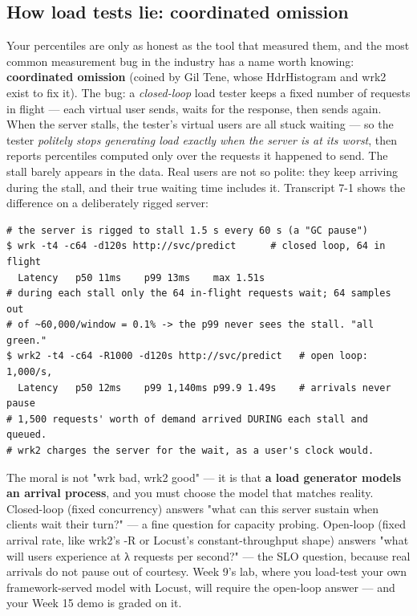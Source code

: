 \subsection*{How load tests lie: coordinated omission}

Your percentiles are only as honest as the tool that measured them, and the most common measurement bug in the industry has a name worth knowing: \textbf{coordinated omission} (coined by Gil Tene, whose HdrHistogram and wrk2 exist to fix it). The bug: a \textit{closed-loop} load tester keeps a fixed number of requests in flight — each virtual user sends, waits for the response, then sends again. When the server stalls, the tester's virtual users are all stuck waiting — so the tester \textit{politely stops generating load exactly when the server is at its worst}, then reports percentiles computed only over the requests it happened to send. The stall barely appears in the data. Real users are not so polite: they keep arriving during the stall, and their true waiting time includes it. Transcript 7-1 shows the difference on a deliberately rigged server:

\begin{terminalbox}
\begin{Verbatim}[breaklines=true,breakanywhere=true,fontsize=\small,formatcom=\color{tbbtermfg},codes=\tbbcodeactive]
# the server is rigged to stall 1.5 s every 60 s (a "GC pause")
$ wrk -t4 -c64 -d120s http://svc/predict      # closed loop, 64 in flight
  Latency   p50 11ms    p99 13ms    max 1.51s
# during each stall only the 64 in-flight requests wait; 64 samples out
# of ~60,000/window = 0.1% -> the p99 never sees the stall. "all green."
$ wrk2 -t4 -c64 -R1000 -d120s http://svc/predict   # open loop: 1,000/s,
  Latency   p50 12ms    p99 1,140ms p99.9 1.49s    # arrivals never pause
# 1,500 requests' worth of demand arrived DURING each stall and queued.
# wrk2 charges the server for the wait, as a user's clock would.
\end{Verbatim}
\end{terminalbox}

The moral is not "wrk bad, wrk2 good" — it is that \textbf{a load generator models an arrival process}, and you must choose the model that matches reality. Closed-loop (fixed concurrency) answers "what can this server sustain when clients wait their turn?" — a fine question for capacity probing. Open-loop (fixed arrival rate, like wrk2's -R or Locust's constant-throughput shape) answers "what will users experience at λ requests per second?" — the SLO question, because real arrivals do not pause out of courtesy. Week 9's lab, where you load-test your own framework-served model with Locust, will require the open-loop answer — and your Week 15 demo is graded on it.

